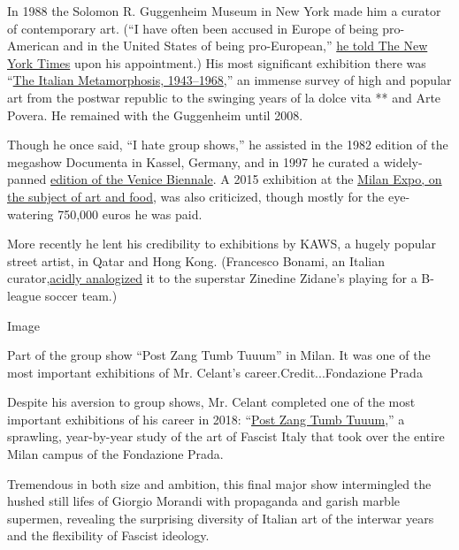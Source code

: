 In 1988 the Solomon R. Guggenheim Museum in New York made him a curator
of contemporary art. (``I have often been accused in Europe of being
pro-American and in the United States of being pro-European,''
\href{https://www.nytimes3xbfgragh.onion/1988/12/01/arts/guggenheim-names-curator.html}{he
told The New York Times} upon his appointment.) His most significant
exhibition there was
``\href{https://www.nytimes3xbfgragh.onion/1994/10/07/arts/art-review-from-postwar-italy-with-style.html}{The
Italian Metamorphosis, 1943--1968},'' an immense survey of high and
popular art from the postwar republic to the swinging years of la dolce
vita ** and Arte Povera. He remained with the Guggenheim until 2008.

Though he once said, ``I hate group shows,'' he assisted in the 1982
edition of the megashow Documenta in Kassel, Germany, and in 1997 he
curated a widely-panned
\href{https://www.nytimes3xbfgragh.onion/1997/06/16/arts/another-venice-biennale-shuffles-to-life.html}{edition
of the Venice Biennale}. A 2015 exhibition at the
\href{https://www.nytimes3xbfgragh.onion/2015/05/04/arts/international/at-milan-worlds-fair-164-years-of-food-and-art.html}{Milan
Expo, on the subject of art and food}, was also criticized, though
mostly for the eye-watering 750,000 euros he was paid.

More recently he lent his credibility to exhibitions by KAWS, a hugely
popular street artist, in Qatar and Hong Kong. (Francesco Bonami, an
Italian
curator,\href{https://www.instagram.com/p/BvbdW6_F3Hl/?hl=en}{acidly
analogized} it to the superstar Zinedine Zidane's playing for a B-league
soccer team.)

Image

Part of the group show ``Post Zang Tumb Tuuum'' in Milan. It was one of
the most important exhibitions of Mr. Celant's
career.Credit...Fondazione Prada

Despite his aversion to group shows, Mr. Celant completed one of the
most important exhibitions of his career in 2018:
``\href{https://www.nytimes3xbfgragh.onion/2018/03/21/arts/design/italian-art-fondazione-prada-palazzo-strozzi.html}{Post
Zang Tumb Tuuum},'' a sprawling, year-by-year study of the art of
Fascist Italy that took over the entire Milan campus of the Fondazione
Prada.

Tremendous in both size and ambition, this final major show intermingled
the hushed still lifes of Giorgio Morandi with propaganda and garish
marble supermen, revealing the surprising diversity of Italian art of
the interwar years and the flexibility of Fascist ideology.

